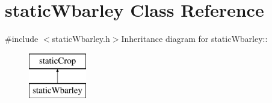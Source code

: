 \hypertarget{classstatic_wbarley}{
\section{staticWbarley Class Reference}
\label{classstatic_wbarley}
}


{\ttfamily \#include $<$staticWbarley.h$>$}Inheritance diagram for staticWbarley::\begin{figure}[H]
\begin{center}
\leavevmode
\includegraphics[height=2cm]{classstatic_wbarley}
\end{center}
\end{figure}

